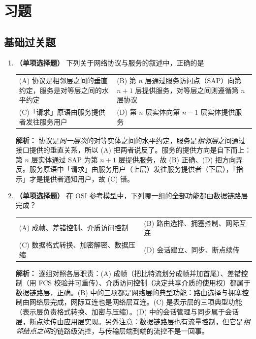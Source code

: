 \section{习题}

\subsection{基础过关题}

\begin{enumerate}

\item \textbf{（单项选择题）} 下列关于网络协议与服务的叙述中，正确的是
\begin{center}
\begin{tabularx}{\linewidth}{@{}XX@{}}
(A) 协议是相邻层之间的垂直约定，服务是对等层之间的水平约定 & (B) 第 $n$ 层通过服务访问点（SAP）向第 $n+1$ 层提供服务，对等层之间则遵循第 $n$ 层协议 \\[4pt]
(C)「请求」原语由服务提供者发往服务用户 & (D) 第 $n$ 层实体向第 $n-1$ 层实体提供服务
\end{tabularx}
\end{center}

\ifshowsolutions\par\noindent\textbf{解析：} 协议是\emph{同一层次}的对等实体之间的水平约定，服务是\emph{相邻层}之间通过接口提供的垂直关系，所以 (A) 把两者说反了。服务的提供方向是自下而上：第 $n$ 层实体通过 SAP 为第 $n+1$ 层提供服务，故 (B) 正确、(D) 把方向弄反。服务原语中「请求」由服务用户（上层）发往服务提供者（下层），「指示」才是提供者通知用户，故 (C) 错。\else \answerarea \fi

\vspace{8pt}

\item \textbf{（单项选择题）} 在 OSI 参考模型中，下列哪一组的全部功能都由数据链路层完成？
\begin{center}
\begin{tabular}{ll}
(A) 成帧、差错控制、介质访问控制 & (B) 路由选择、拥塞控制、网际互连 \\[4pt]
(C) 数据格式转换、加密解密、数据压缩 & (D) 会话建立、同步、断点续传
\end{tabular}
\end{center}

\ifshowsolutions\par\noindent\textbf{解析：} 逐组对照各层职责：(A) 成帧（把比特流划分成帧并加首尾）、差错控制（用 FCS 校验并可重传）、介质访问控制（决定共享介质的使用权）都属于数据链路层，正确。(B) 中的三项都是网络层的典型功能：路由选择与拥塞控制由网络层完成，网际互连也是网络层互连。(C) 是表示层的三项典型功能（表示层负责格式转换、加密与压缩）。(D) 中的会话管理与同步属于会话层，断点续传由应用层实现。另外注意：数据链路层也有流量控制，但它是\emph{相邻结点之间}的链路级流控，与传输层端到端的流控不是一回事。\else \answerarea \fi


\end{enumerate}
